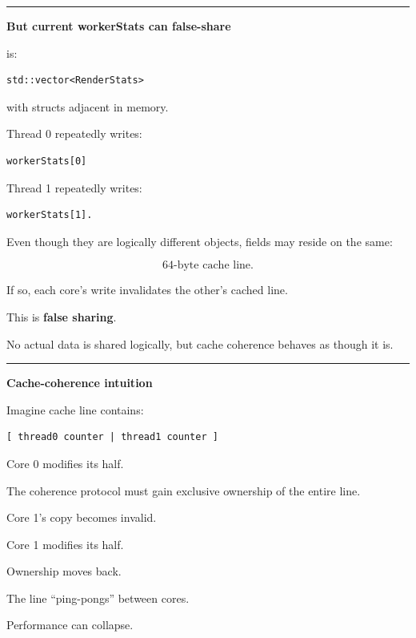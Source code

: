 \begin{center}\rule{0.5\linewidth}{0.5pt}\end{center}

\textbf{But current workerStats can false-share}

 is:

\begin{verbatim}
std::vector<RenderStats>
\end{verbatim}

with structs adjacent in memory.

Thread 0 repeatedly writes:

\begin{verbatim}
workerStats[0]
\end{verbatim}

Thread 1 repeatedly writes:

\begin{verbatim}
workerStats[1].
\end{verbatim}

Even though they are logically different objects, fields may reside on the same:

\[
64\text{-byte cache line}.
\]

If so, each core's write invalidates the other's cached line.

This is \textbf{false sharing}.

No actual data is shared logically, but cache coherence behaves as though it is.

\begin{center}\rule{0.5\linewidth}{0.5pt}\end{center}

\textbf{Cache-coherence intuition}

Imagine cache line contains:

\begin{verbatim}
[ thread0 counter | thread1 counter ]
\end{verbatim}

Core 0 modifies its half.

The coherence protocol must gain exclusive ownership of the entire line.

Core 1's copy becomes invalid.

Core 1 modifies its half.

Ownership moves back.

The line ``ping-pongs'' between cores.

Performance can collapse.


